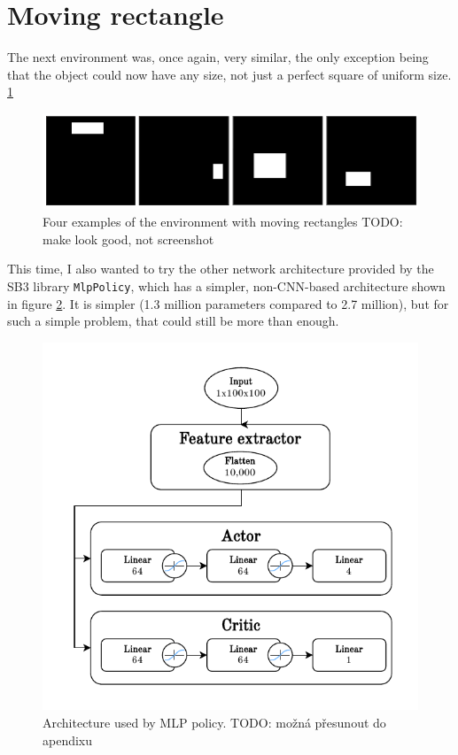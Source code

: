 \documentclass[
  digital,     %
  oneside,     %
  nosansbold,  %
  nocolorbold, %
  lof,         %
  lot,         %
]{fithesis4}
\begin{document}
\section{Moving rectangle}
\label{subsec:moving_rectangle}
The next environment was, once again, very similar, the only exception being that the object could now have any size, not just a perfect square of uniform size. \ref{fig:env2}

\begin{figure}
    \includegraphics[width=1\linewidth]{env_examples/env2.png}
    \caption{Four examples of the environment with moving rectangles TODO: make look good, not screenshot}
    \label{fig:env2}
\end{figure}

This time, I also wanted to try the other network architecture provided by the SB3 library \texttt{MlpPolicy}, which has a simpler, non-CNN-based architecture shown in figure \ref{fig:mlp_policy}. It is simpler (1.3 million parameters compared to 2.7 million), but for such a simple problem, that could still be more than enough.

\begin{figure}
    \includegraphics[width=1\linewidth]{diagrams/mlp_arch.pdf}
    \caption{Architecture used by MLP policy. TODO: možná přesunout do apendixu}
    \label{fig:mlp_policy}
\end{figure}
\end{document}
